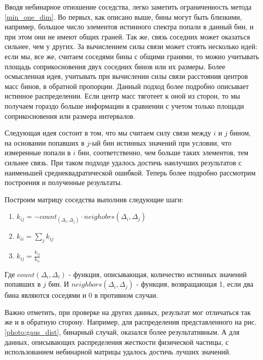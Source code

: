 \documentclass[a4paper,12pt]{diplom}
\begin{document}
Вводя небинарное отношение соседства, легко заметить ограниченность метода \eqref{min_one_dim}. Во первых, как описано выше, бины могут 
быть близкими, например, большое число элементов истинного спектра попали в данный бин, и при этом они не имеют общих граней. Так же, 
связь соседних может оказаться сильнее, чем у других. За вычислением силы связи может стоять несколько идей: если мы, все же, 
считаем соседями бины с общими гранями, то можно учитывать площадь соприкосновения двух соседних бинов или их размеры. 
Более осмысленная идея, учитывать при вычислении силы связи расстояния центров масс бинов, в обратной пропорции. 
Данный подход более подробно описывает истинное распределении. Если центр масс 
тяготеет к оной из сторон, то мы получаем гораздо больше информации в сравнении с учетом только площади соприкосновения или размера интервалов. 

Следующая идея состоит в том, что мы считаем силу связи между $i$ и $j$ бином, на основании попавших в $j$-ый бин истинных значений при условии,
что измеренные попали в $i$ бин, соответственно, чем больше таких элементов, тем сильнее связь. При таком подходе удалось достичь наилучших 
результатов с наименьшей среднеквадратической ошибкой. Теперь более подробно рассмотрим построения и полученные результаты.

Построим матрицу соседства выполнив следующие шаги:

\begin{enumerate}
   \item  $k_{ij} = - count_(\Delta_{i}, \Delta_{j}) \cdot neighobrs(\Delta_{i}, \Delta_{j})$ \\

   \item  $k_{ii} = \displaystyle\sum_{j} k_{ij}$ \\

   \item  $k_{ij} = \frac{k_{ij}}{k_{ii}}$

\end{enumerate}

Где $count(\Delta_{i}, \Delta_{i})$ - функция, описывающая, количество истинных значений попавших в $j$ бин. 
И $neighbors(\Delta_{i}, \Delta_{j})$ - функция, возвращающая 1, если два бина являются соседями и 0 в противном случаи.

Важно отметить, при проверке на других данных, результат мог отличаться так же и в обратную сторону. Например, для распределения
представленного на рис. \ref{photo:gaus_dist}, бинарный случай, оказался более результативным. А для данных, описывающих распределения жесткости
физической частицы, с использованием небинарной матрицы удалось достичь лучших значений.
\end{document}

